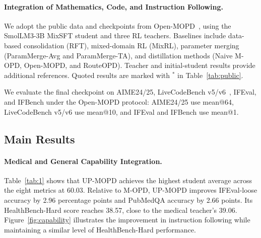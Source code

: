 \documentclass{article}
\begin{document}
\paragraph{Integration of Mathematics, Code, and Instruction Following.}
We adopt the public data and checkpoints from Open-MOPD~\citep{ref3}, using the SmolLM3-3B MixSFT student and three RL teachers. Baselines include data-based consolidation (RFT), mixed-domain RL (MixRL), parameter merging (ParamMerge-Avg and ParamMerge-TA), and distillation methods (Naive M-OPD, Open-MOPD, and RouteOPD). Teacher and initial-student results provide additional references. Quoted results are marked with $^*$ in Table~\ref{tab:public}.

We evaluate the final checkpoint on AIME24/25, LiveCodeBench v5/v6~\citep{ref14}, IFEval, and IFBench under the Open-MOPD protocol: AIME24/25 use mean@64, LiveCodeBench v5/v6 use mean@10, and IFEval and IFBench use mean@1.

\subsection{Main Results}
\label{sec:exp_main}

\paragraph{Medical and General Capability Integration.}
Table~\ref{tab:1} shows that UP-MOPD achieves the highest student average across the eight metrics at 60.03. Relative to M-OPD, UP-MOPD improves IFEval-loose accuracy by 2.96 percentage points and PubMedQA accuracy by 2.66 points. Its HealthBench-Hard score reaches 38.57, close to the medical teacher's 39.06. Figure~\ref{fig:capability} illustrates the improvement in instruction following while maintaining a similar level of HealthBench-Hard performance.
\end{document}

